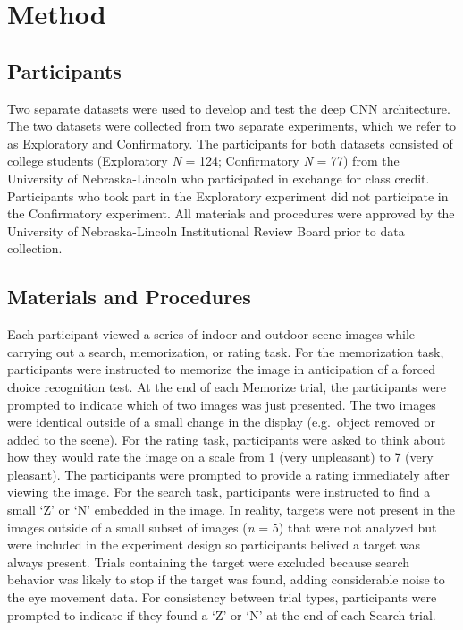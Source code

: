\documentclass[
  english,
  man, donotrepeattitle,floatsintext]{apa6}
\begin{document}
\section{Method}
\subsection{Participants}

Two separate datasets were used to develop and test the deep CNN architecture. The two datasets were collected from two separate experiments, which we refer to as Exploratory and Confirmatory. The participants for both datasets consisted of college students (Exploratory \emph{N} = 124; Confirmatory \emph{N} = 77) from the University of Nebraska-Lincoln who participated in exchange for class credit. Participants who took part in the Exploratory experiment did not participate in the Confirmatory experiment. All materials and procedures were approved by the University of Nebraska-Lincoln Institutional Review Board prior to data collection.

\subsection{Materials and Procedures}

Each participant viewed a series of indoor and outdoor scene images while carrying out a search, memorization, or rating task. For the memorization task, participants were instructed to memorize the image in anticipation of a forced choice recognition test. At the end of each Memorize trial, the participants were prompted to indicate which of two images was just presented. The two images were identical outside of a small change in the display (e.g.~object removed or added to the scene). For the rating task, participants were asked to think about how they would rate the image on a scale from 1 (very unpleasant) to 7 (very pleasant). The participants were prompted to provide a rating immediately after viewing the image. For the search task, participants were instructed to find a small `Z' or `N' embedded in the image. In reality, targets were not present in the images outside of a small subset of images (\emph{n} = 5) that were not analyzed but were included in the experiment design so participants belived a target was always present. Trials containing the target were excluded because search behavior was likely to stop if the target was found, adding considerable noise to the eye movement data. For consistency between trial types, participants were prompted to indicate if they found a `Z' or `N' at the end of each Search trial.
\end{document}
